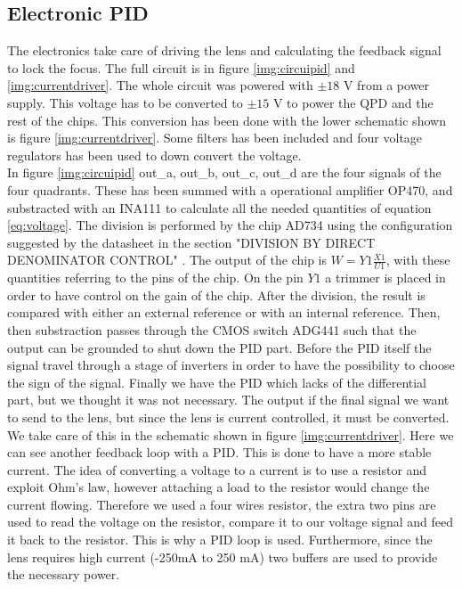 \documentclass[a4paper,10pt]{article}
\begin{document}
\subsection{Electronic PID}
The electronics take care of driving the lens and calculating the feedback signal to lock the focus. The full circuit is in figure \ref{img:circuipid} and \ref{img:currentdriver}. The whole circuit was powered with $\pm18$ V from a power supply. This voltage has to be converted to $\pm 15$ V to power the QPD and the rest of the chips. This conversion has been done with the lower schematic shown is figure \ref{img:currentdriver}. Some filters has been included and four voltage regulators has been used to down convert the voltage.\\
In figure \ref{img:circuipid} out\_a,  out\_b, out\_c, out\_d are the four signals of the four quadrants. These has been summed with a operational amplifier OP470, and substracted with an INA111 to calculate all the needed quantities of equation \eqref{eq:voltage}. The division is performed by the chip AD734 using the configuration suggested by the datasheet in the section "DIVISION BY DIRECT DENOMINATOR CONTROL" \cite{ad734}. The output of the chip is $W = Y1\frac{X1}{U1}$, with these quantities referring to the pins of the chip. On the pin $Y1$ a trimmer is placed in order to have control on the gain of the chip. After the division, the result is compared with either an external reference or with an internal reference. Then, then substraction passes through the CMOS switch ADG441 such that the output can be grounded to shut down the PID part. Before the PID itself the signal travel through a stage of inverters in order to have the possibility to choose the sign of the signal. Finally we have the PID which lacks of the differential part, but we thought it was not necessary. The output if the final signal we want to send to the lens, but since the lens is current controlled, it must be converted. We take care of this in the schematic shown in figure \ref{img:currentdriver}. Here we can see another feedback loop with a PID. This is done to have a more stable current. The idea of converting a voltage to a current is to use a resistor and exploit Ohm's law, however attaching a load to the resistor would change the current flowing. Therefore we used a four wires resistor, the extra two pins are used to read the voltage on the resistor, compare it to our voltage signal and feed it back to the resistor. This is why a PID loop is used. Furthermore, since the lens requires high current (-250mA to 250 mA) two buffers are used to provide the necessary power.\\
\end{document}
